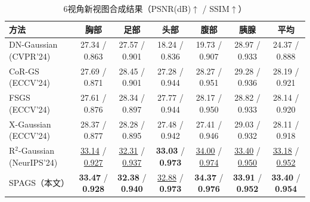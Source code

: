 \begin{table}[htbp]
    \centering
    \caption{6视角新视图合成结果（PSNR(dB)$\uparrow$ / SSIM$\uparrow$）}
    \label{tab:spags_6view}
    \footnotesize
    \begin{tabular*}{\textwidth}{@{\extracolsep{\fill}}lcccccc@{}}
        \toprule
        方法 & 胸部 & 足部 & 头部 & 腹部 & 胰腺 & 平均 \\
        \midrule
        DN-Gaussian (CVPR'24) & 27.34 / 0.863 & 27.57 / 0.901 & 18.24 / 0.836 & 19.73 / 0.907 & 28.97 / 0.933 & 24.37 / 0.888 \\
        CoR-GS (ECCV'24) & 27.69 / 0.871 & 28.45 / 0.901 & 27.28 / 0.944 & 28.27 / 0.951 & 29.28 / 0.936 & 28.19 / 0.921 \\
        FSGS (ECCV'24) & 27.61 / 0.876 & 28.34 / 0.897 & 27.77 / 0.944 & 28.17 / 0.950 & 28.82 / 0.933 & 28.14 / 0.920 \\
        X-Gaussian (ECCV'24) & 28.37 / 0.877 & 28.28 / 0.895 & 27.48 / 0.942 & 27.41 / 0.946 & 29.03 / 0.932 & 28.11 / 0.918 \\
        R$^2$-Gaussian (NeurIPS'24) & \underline{33.14} / \underline{0.927} & \underline{32.31} / \underline{0.937} & \textbf{33.03} / \textbf{0.973} & \underline{34.00} / \underline{0.974} & \underline{33.40} / \underline{0.950} & \underline{33.18} / \underline{0.952} \\
        SPAGS（本文） & \textbf{33.47} / \textbf{0.928} & \textbf{32.38} / \textbf{0.940} & \underline{32.88} / \textbf{0.973} & \textbf{34.37} / \textbf{0.976} & \textbf{33.91} / \textbf{0.952} & \textbf{33.40} / \textbf{0.954} \\
        \bottomrule
    \end{tabular*}
\end{table}

